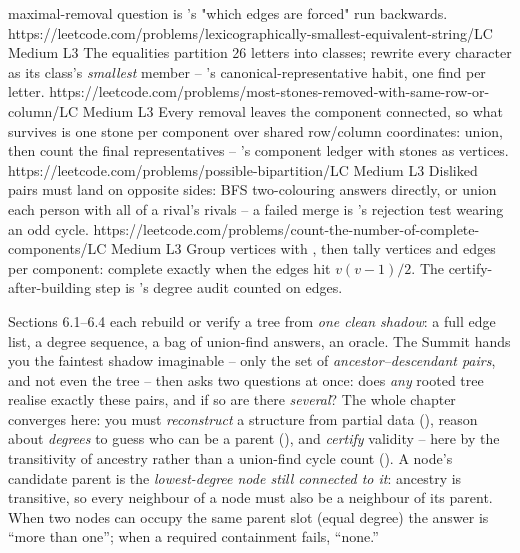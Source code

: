 \begin{mixedset}
{    maximal-removal question is 's "which edges are forced" run
    backwards.}
    {https://leetcode.com/problems/lexicographically-smallest-equivalent-string/}{LC Medium L3}
    {The equalities partition 26 letters into classes; rewrite every character as its
    class's \emph{smallest} member -- 's canonical-representative
    habit, one find per letter.}
    {https://leetcode.com/problems/most-stones-removed-with-same-row-or-column/}{LC Medium L3}
    {Every removal leaves the component connected, so what survives is one stone per
    component over shared row/column coordinates: union, then count the final
    representatives -- 's component ledger with stones as
    vertices.}
    {https://leetcode.com/problems/possible-bipartition/}{LC Medium L3}
    {Disliked pairs must land on opposite sides: BFS two-colouring answers directly, or
    union each person with all of a rival's rivals -- a failed merge is
    's rejection test wearing an odd cycle.}
    {https://leetcode.com/problems/count-the-number-of-complete-components/}{LC Medium L3}
    {Group vertices with , then tally vertices and edges per component:
    complete exactly when the edges hit $v(v-1)/2$. The certify-after-building step is
    's degree audit counted on edges.}
\end{mixedset}



\begin{notebox}
Sections 6.1--6.4 each rebuild or verify a tree from \emph{one clean shadow}: a full edge list, a
degree sequence, a bag of union-find answers, an oracle. The Summit hands you the faintest shadow
imaginable -- only the set of \emph{ancestor--descendant pairs}, and not even the tree -- then asks
two questions at once: does \emph{any} rooted tree realise exactly these pairs, and if so are there
\emph{several}? The whole chapter converges here: you must \emph{reconstruct} a structure from
partial data (), reason about \emph{degrees} to guess who can be a parent
(), and \emph{certify} validity -- here by the transitivity of ancestry rather
than a union-find cycle count (). A node's candidate parent is the
\emph{lowest-degree node still connected to it}: ancestry is transitive, so every neighbour of a
node must also be a neighbour of its parent. When two nodes can occupy the same parent slot (equal
degree) the answer is ``more than one''; when a required containment fails, ``none.''
\end{notebox}

